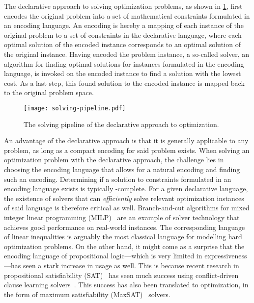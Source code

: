 The declarative approach to solving optimization problems, as shown in \cref{fig:solving-pipeline}, first encodes the original problem into a set of mathematical constraints formulated in an encoding language.
An encoding is hereby a mapping of each instance of the original problem to a set of constraints in the declarative language, where each optimal solution of the encoded instance corresponds to an optimal solution of the original instance.
Having encoded the problem instance, a so-called solver, an algorithm for finding optimal solutions for instances formulated in the encoding language, is invoked on the encoded instance to find a solution with the lowest cost.
As a last step, this found solution to the encoded instance is mapped back to the original problem space.

\begin{figure}
  \centering
  \texttt{[image: solving-pipeline.pdf]}
  \caption{The solving pipeline of the declarative approach to optimization.}\label{fig:solving-pipeline}
\end{figure}

An advantage of the declarative approach is that it is generally applicable to any problem, as long as a compact encoding for said problem exists.
When solving an optimization problem with the declarative approach, the challenge lies in choosing the encoding language that allows for a natural encoding and finding such an encoding.
Determining if a solution to constraints formulated in an encoding language exists is typically \NP-complete.
For a given declarative language, the existence of solvers that can \emph{efficiently} solve relevant optimization instances of said language is therefore critical as well.
Branch-and-cut algorithms for mixed integer linear programming (MILP)~\autocite{ChenEtAl2010-intro,KorteVygen2018-5} are an example of solver technology that achieves good performance on real-world instances.
The corresponding language of linear inequalities is arguably the most classical language for modelling hard optimization problems.
On the other hand, it might come as a surprise that the encoding language of propositional logic---which is very limited in expressiveness---has seen a stark increase in usage as well.
This is because recent research in propositional satisfiability (SAT)~\autocite{handbook2-sat} has seen much success using conflict-driven clause learning solvers~\autocite{handbook2-cdcl}.
This success has also been translated to optimization, in the form of maximum satisfiability (MaxSAT)~\autocite{handbook2-maxsat} solvers.

